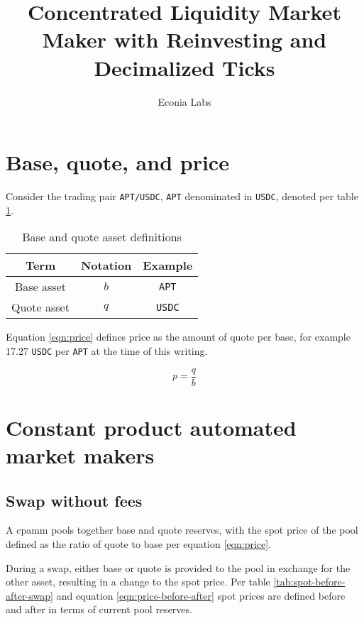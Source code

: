 \documentclass[table, twocolumn]{article}
\title{Concentrated Liquidity Market Maker with Reinvesting and Decimalized Ticks}
\author{Econia Labs}
\date{}
\begin{document}
\maketitle

\section{Base, quote, and price}

Consider the trading pair \texttt{APT/USDC}, \texttt{APT} denominated in \texttt{USDC}, denoted per
table \ref{tab:base-quote-definition}.

\begin{table}[!htb]
  \centering
  \begin{tabular}{|c|c|c|}
    \hline \rowcolor{blue}
    Term        & Notation & Example       \\ \hline
    Base asset  & $b$      & \texttt{APT}  \\ \hline
    Quote asset & $q$      & \texttt{USDC} \\ \hline
  \end{tabular}
  \caption{Base and quote asset definitions}
  \label{tab:base-quote-definition}
\end{table}

Equation \ref{eqn:price} defines price as the amount of quote per base, for example 17.27
\texttt{USDC} per \texttt{APT} at the time of this writing.

\begin{equation} \label{eqn:price}
  p = \frac{q}{b}
\end{equation}

\section{Constant product automated market makers}

\subsection{Swap without fees}

A \gls{cpamm} pools together base and quote reserves, with the spot price of the pool defined as the
ratio of quote to base per equation \ref{eqn:price}.

During a swap, either base or quote is provided to the pool in exchange for the other asset,
resulting in a change to the spot price. Per table \ref{tab:spot-before-after-swap} and equation
\ref{eqn:price-before-after} spot prices are defined before and after in terms of current pool
reserves.
\end{document}
